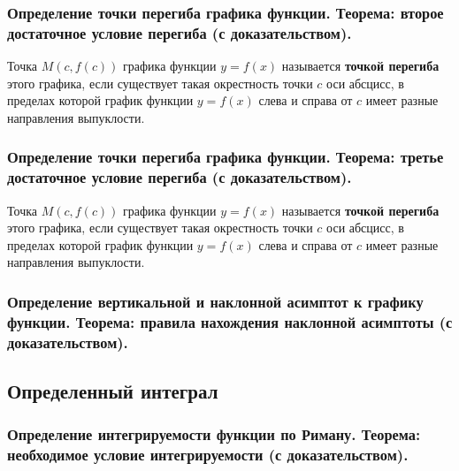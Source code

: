 \documentclass[10pt]{article}
\begin{document}
    \subsubsection{Определение точки перегиба графика функции. Теорема: второе достаточное условие перегиба (с доказательством).}
    \begin{definition}
        Точка $M(c, f(c))$ графика функции $y = f(x)$ называется \textbf{точкой перегиба} этого графика, если существует такая окрестность точки $c$ оси абсцисс, в пределах которой график функции $y = f(x)$ слева и справа от $c$ имеет разные направления выпуклости.
    \end{definition}



    \subsubsection{Определение точки перегиба графика функции. Теорема: третье достаточное условие перегиба (с доказательством).}
    \begin{definition}
        Точка $M(c, f(c))$ графика функции $y = f(x)$ называется \textbf{точкой перегиба} этого графика, если существует такая окрестность точки $c$ оси абсцисс, в пределах которой график функции $y = f(x)$ слева и справа от $c$ имеет разные направления выпуклости.
    \end{definition}



    \subsubsection{Определение вертикальной и наклонной асимптот к графику функции. Теорема: правила нахождения наклонной асимптоты (с доказательством).}


    
    \subsection{Определенный интеграл}
    \subsubsection{Определение интегрируемости функции по Риману. Теорема: необходимое условие интегрируемости (с доказательством).}
\end{document}
